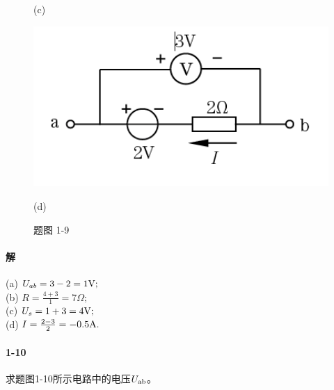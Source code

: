 \documentclass[hyperref, UTF8]{ctexart}
\begin{document}
\begin{figure}[!htb]
\begin{minipage}[t]{0.254\textwidth}
    \caption*{(c)}
  \end{minipage}
  \begin{minipage}[t]{0.263\textwidth}
    \centering
    \includegraphics[width=1\textwidth]{p1-9-d.png}
    \caption*{(d)}
  \end{minipage}
  \caption*{题图 1-9}
\end{figure}

\paragraph{解}
(a) $U_{ab}=3-2=1{\rm V}; $ \\

(b) $R=\frac{4+3}{1}=7\Omega; $ \\

(c) $U_s=1+3=4{\rm V}; $ \\

(d) $I=\frac{2-3}{2}=-0.5{\rm A}. $ \\

\paragraph{1-10} \label{1-10}
求题图1-10所示电路中的电压$U_{\rm ab}$。 \\
\end{document}
